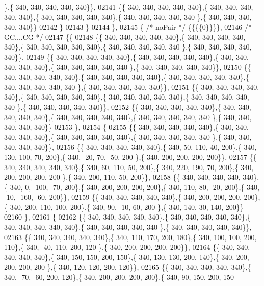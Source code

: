 \begin{DoxyCode}
      \},\{ 340, 340, 340, 340, 340\}\},
02141 \{\{ 340, 340, 340, 340, 340\},\{ 340, 340, 340, 340, 340\},\{ 340, 340, 340, 340, 340\},\{ 340, 340, 340, 340, 340
      \},\{ 340, 340, 340, 340, 340\}\}
02142 \}
02143 \}
02144 \},
02145 \{ \textcolor{comment}{/* noPair */} \{\{\{\{0\}\}\}\},
02146 \textcolor{comment}{/* GC....CG */}
02147 \{\{
02148 \{\{ 340, 340, 340, 340, 340\},\{ 340, 340, 340, 340, 340\},\{ 340, 340, 340, 340, 340\},\{ 340, 340, 340, 340, 340
      \},\{ 340, 340, 340, 340, 340\}\},
02149 \{\{ 340, 340, 340, 340, 340\},\{ 340, 340, 340, 340, 340\},\{ 340, 340, 340, 340, 340\},\{ 340, 340, 340, 340, 340
      \},\{ 340, 340, 340, 340, 340\}\},
02150 \{\{ 340, 340, 340, 340, 340\},\{ 340, 340, 340, 340, 340\},\{ 340, 340, 340, 340, 340\},\{ 340, 340, 340, 340, 340
      \},\{ 340, 340, 340, 340, 340\}\},
02151 \{\{ 340, 340, 340, 340, 340\},\{ 340, 340, 340, 340, 340\},\{ 340, 340, 340, 340, 340\},\{ 340, 340, 340, 340, 340
      \},\{ 340, 340, 340, 340, 340\}\},
02152 \{\{ 340, 340, 340, 340, 340\},\{ 340, 340, 340, 340, 340\},\{ 340, 340, 340, 340, 340\},\{ 340, 340, 340, 340, 340
      \},\{ 340, 340, 340, 340, 340\}\}
02153 \},
02154 \{
02155 \{\{ 340, 340, 340, 340, 340\},\{ 340, 340, 340, 340, 340\},\{ 340, 340, 340, 340, 340\},\{ 340, 340, 340, 340, 340
      \},\{ 340, 340, 340, 340, 340\}\},
02156 \{\{ 340, 340, 340, 340, 340\},\{ 340,  50, 110,  40, 200\},\{ 340, 130, 100,  70, 200\},\{ 340, -20,  70, -50, 200
      \},\{ 340, 200, 200, 200, 200\}\},
02157 \{\{ 340, 340, 340, 340, 340\},\{ 340,  60, 110,  50, 200\},\{ 340, 220, 190,  70, 200\},\{ 340, 200, 200, 200, 200
      \},\{ 340, 200, 110,  50, 200\}\},
02158 \{\{ 340, 340, 340, 340, 340\},\{ 340,   0, -100, -70, 200\},\{ 340, 200, 200, 200, 200\},\{ 340, 110,  80, -20, 
      200\},\{ 340, -10, -160, -60, 200\}\},
02159 \{\{ 340, 340, 340, 340, 340\},\{ 340, 200, 200, 200, 200\},\{ 340, 200, 110, 100, 200\},\{ 340,  90, -10,  60, 200
      \},\{ 340, 140,  30, 140, 200\}\}
02160 \},
02161 \{
02162 \{\{ 340, 340, 340, 340, 340\},\{ 340, 340, 340, 340, 340\},\{ 340, 340, 340, 340, 340\},\{ 340, 340, 340, 340, 340
      \},\{ 340, 340, 340, 340, 340\}\},
02163 \{\{ 340, 340, 340, 340, 340\},\{ 340, 110, 170, 200, 180\},\{ 340, 100, 100, 200, 110\},\{ 340, -40, 110, 200, 120
      \},\{ 340, 200, 200, 200, 200\}\},
02164 \{\{ 340, 340, 340, 340, 340\},\{ 340, 150, 150, 200, 150\},\{ 340, 130, 130, 200, 140\},\{ 340, 200, 200, 200, 200
      \},\{ 340, 120, 120, 200, 120\}\},
02165 \{\{ 340, 340, 340, 340, 340\},\{ 340, -70, -60, 200, 120\},\{ 340, 200, 200, 200, 200\},\{ 340,  90, 150, 200, 150

\end{DoxyCode}
